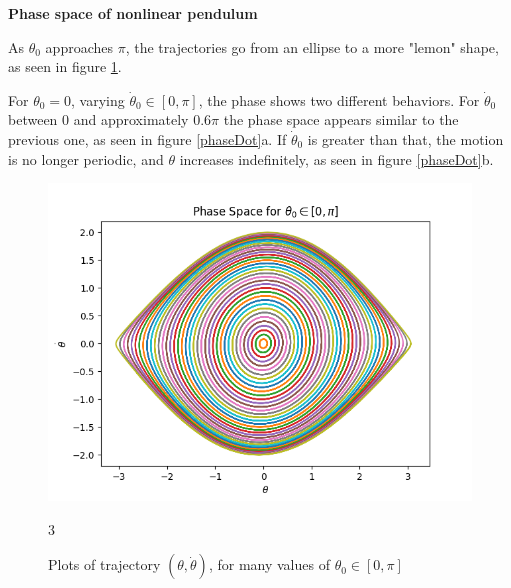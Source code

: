 \documentclass[12pt]{article}
\newenvironment{problem}[2][]{\begin{trivlist}
\item[\hskip \labelsep {\bfseries #1}\hskip \labelsep {\bfseries #2.}]}{\end{trivlist}}
\begin{document}
\begin{problem}{1}
	\textbf{Phase space of nonlinear pendulum}

	As $\theta_{0}$ approaches $\pi$, the trajectories go from an ellipse to a more "lemon" shape, as seen in figure \ref{phase}.

	For $\theta_{0} = 0$, varying $\dot{\theta}_{0} \in [0,\pi]$, the phase shows two different behaviors.  For $\dot{\theta}_{0}$ between 0 and approximately $0.6\pi$ the phase space appears similar to the previous one, as seen in figure \ref{phaseDot}a.  If $\dot{\theta}_{0}$ is greater than that, the motion is no longer periodic, and $\theta$ increases indefinitely, as seen in figure \ref{phaseDot}b.

\begin{figure}[ht!]
	\centering
	\includegraphics[scale=0.6]{../figures/phaseSpace.png}
	\caption{Plots of trajectory $(\theta,\dot{\theta})$, for many values of $\theta_{0} \in [0,\pi]$}
	3\label{phase}
\end{figure}


\end{problem}
\end{document}

